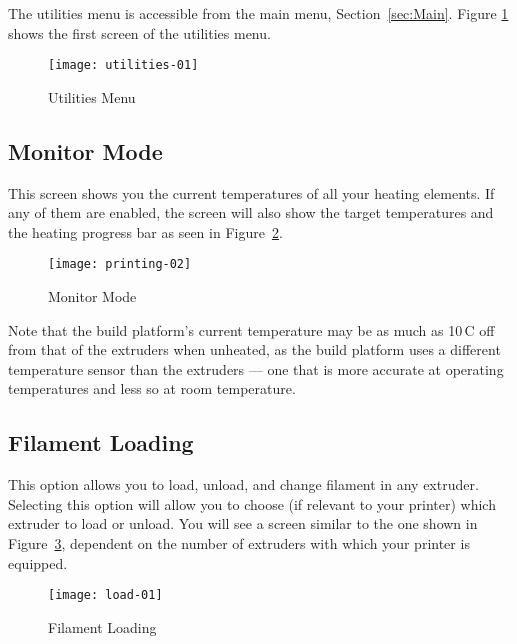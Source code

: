 The utilities menu is accessible from the main menu, Section~\ref{sec:Main}.  Figure \ref{fig:utilitiesfirstscreen} shows the first screen of the utilities menu.

\begin{figure}[!htbp]
  \centering
    \texttt{[image: utilities-01]}
    \caption{Utilities Menu}
  \label{fig:utilitiesfirstscreen}
\end{figure}


\subsection{Monitor Mode} \label{sec:monmode}

This screen shows you the current temperatures of all your heating elements.  If any of them are enabled, the screen will also show the target temperatures and the heating progress bar as seen in Figure~\ref{fig:heatmonmode}.

\begin{figure}[!htbp]
  \centering
    \texttt{[image: printing-02]}
    \caption{Monitor Mode}
  \label{fig:heatmonmode}
\end{figure}

Note that the build platform's current temperature may be as much as 10\textdegree\,C off from that of the extruders when unheated, as the build platform uses a different temperature sensor than the extruders --- one that is more accurate at operating temperatures and less so at room temperature.


\subsection{Filament Loading} \label{sec:filload}

This option allows you to load, unload, and change filament in any extruder.  Selecting this option will allow you to choose (if relevant to your printer) which extruder to load or unload.  You will see a screen similar to the one shown in Figure~\ref{fig:filload}, dependent on the number of extruders with which your printer is equipped.

\begin{figure}[!htbp]
  \centering
    \texttt{[image: load-01]}
    \caption{Filament Loading}
  \label{fig:filload}
\end{figure}

